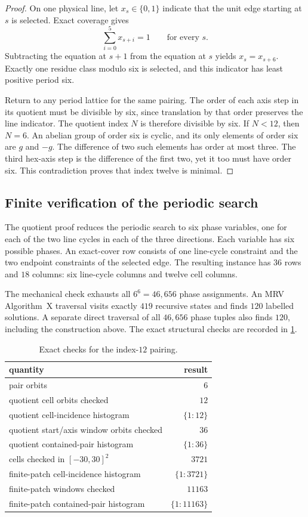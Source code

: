 \begin{proof}
On one physical line, let $x_s\in\{0,1\}$ indicate that the unit edge starting
at $s$ is selected.  Exact coverage gives
\[
 \sum_{i=0}^{5}x_{s+i}=1
 \qquad\text{for every }s.
\]
Subtracting the equation at $s+1$ from the equation at $s$ yields
$x_s=x_{s+6}$.  Exactly one residue class modulo six is selected, and this
indicator has least positive period six.

Return to any period lattice for the same pairing.  The order of each axis
step in its quotient must be divisible by six, since translation by that
order preserves the line indicator.  The quotient index $N$ is therefore
divisible by six.  If $N<12$, then $N=6$.  An abelian group of order six is
cyclic, and its only elements of order six are $g$ and $-g$.  The difference
of two such elements has order at most three.  The third hex-axis step is the
difference of the first two, yet it too must have order six.  This
contradiction proves that index twelve is minimal.
\end{proof}

\subsection{Finite verification of the periodic search}

The quotient proof reduces the periodic search to six phase variables, one
for each of the two line cycles in each of the three directions.  Each
variable has six possible phases.  An exact-cover row consists of one
line-cycle constraint and the two endpoint constraints of the selected edge.
The resulting instance has $36$ rows and $18$ columns: six line-cycle columns
and twelve cell columns.

The mechanical check exhausts all $6^6=46{,}656$ phase assignments.  An MRV
Algorithm~X traversal visits exactly $419$ recursive states and finds $120$
labelled solutions.  A separate direct traversal of all $46{,}656$ phase
tuples also finds $120$, including the construction above.  The exact
structural checks are recorded in \cref{tab:pairing-checks}.

\begin{table}[tb]
\centering
\caption{Exact checks for the index-$12$ pairing.}
\label{tab:pairing-checks}
\begin{tabular}{lr}
\toprule
quantity & result\\
\midrule
pair orbits & $6$\\
quotient cell orbits checked & $12$\\
quotient cell-incidence histogram & $\{1:12\}$\\
quotient start/axis window orbits checked & $36$\\
quotient contained-pair histogram & $\{1:36\}$\\
cells checked in $[-30,30]^2$ & $3721$\\
finite-patch cell-incidence histogram & $\{1:3721\}$\\
finite-patch windows checked & $11163$\\
finite-patch contained-pair histogram & $\{1:11163\}$\\
\bottomrule
\end{tabular}
\end{table}

